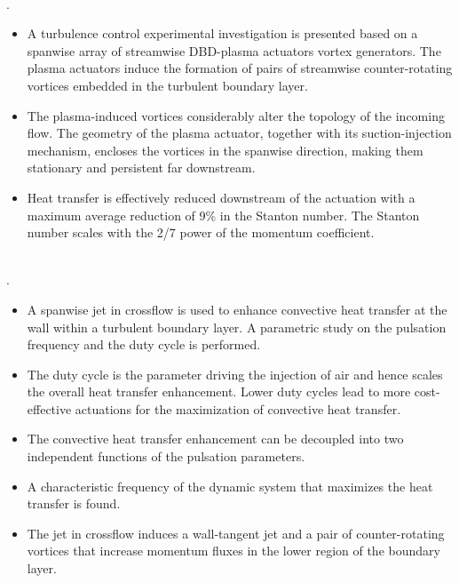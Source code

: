  \\
.

\begin{itemize}
  \item A turbulence control experimental investigation is presented based on a spanwise array of streamwise DBD-plasma actuators vortex generators. The plasma actuators induce the formation of pairs of streamwise counter-rotating vortices embedded in the turbulent boundary layer. 
  \item The plasma-induced vortices considerably alter the topology of the incoming flow. The geometry of the plasma actuator, together with its suction-injection mechanism, encloses the vortices in the spanwise direction, making them stationary and persistent far downstream.
  \item Heat transfer is effectively reduced downstream of the actuation with a maximum average reduction of 9\% in the Stanton number. The Stanton number scales with the 2/7 power of the momentum coefficient.
\end{itemize}
\vspace{.5cm}

\\
.

\begin{itemize}
    \item A spanwise jet in crossflow is used to enhance convective heat transfer at the wall within a turbulent boundary layer. A parametric study on the pulsation frequency and the duty cycle is performed.
    \item The duty cycle is the parameter driving the injection of air and hence scales the overall heat transfer enhancement. Lower duty cycles lead to more cost-effective actuations for the maximization of convective heat transfer.
    \item The convective heat transfer enhancement can be decoupled into two independent functions of the pulsation parameters.
    \item A characteristic frequency of the dynamic system that maximizes the heat transfer is found.
    \item The jet in crossflow induces a wall-tangent jet and a pair of counter-rotating vortices that increase momentum fluxes in the lower region of the boundary layer.
\end{itemize}
\vspace{.5cm}

